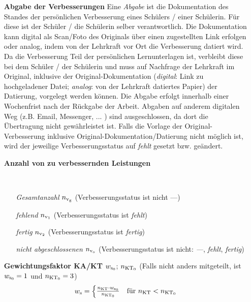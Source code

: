 \begin{enumerate}[label=\textbf{\textbullet}, align=left, leftmargin=*]
	\item[\textbf{Abgabe der Verbesserungen}] { \scriptsize Eine \glqq \textit{Abgabe}\grqq{} ist die Dokumentation des Standes der persönlichen Verbesserung eines Schülers / einer Schülerin. Für diese ist der Schüler / die Schülerin selber verantwortlich. Die Dokumentation kann digital als Scan/Foto des Originals über einen zugestellten Link erfolgen oder analog, indem von der Lehrkraft vor Ort die Verbesserung datiert wird. Da die Verbesserung Teil der persönlichen Lernunterlagen ist, verbleibt diese bei dem Schüler / der Schülerin und muss auf Nachfrage der Lehrkraft im Original, inklusive der Original-Dokumentation (\textit{digital}: Link zu hochgeladener Datei; \textit{analog}: von der Lehrkraft datiertes Papier) der Datierung, vorgelegt werden können. Die Abgabe erfolgt innerhalb einer Wochenfrist nach der Rückgabe der Arbeit. Abgaben auf anderem digitalen Weg (z.B. Email, Messenger, ... ) sind ausgeschlossen, da dort die Übertragung nicht gewährleistet ist. Falls die Vorlage der Original-Verbesserung inklusive Original-Dokumentation/Datierung nicht möglich ist, wird der jeweilige Verbesserungsstatus auf \glqq \textit{fehlt}\grqq{} gesetzt bzw. geändert.} 
	\item[\textbf{Anzahl von zu verbessernden Leistungen}] { \scriptsize \mbox{} \
	\setlength{\columnsep}{-20pt}
	\begin{multicols}{2}
	\begin{enumerate}[label=\textbf{\textbullet}, align=left, leftmargin=*]
		\item[\textit{Gesamtanzahl}] $n_{\mathrm{v}_\mathrm{g}}$ (Verbesserungsstatus ist nicht \glqq ---\grqq{})
		\item[\textit{fehlend}] $n_{\mathrm{v}_1}$ (Verbesserungsstatus ist \glqq \textit{fehlt}\grqq{})
		\item[\textit{fertig}] $n_{\mathrm{v}_2}$ (Verbesserungsstatus ist \glqq \textit{fertig}\grqq{})
		\item[\textit{nicht abgeschlossenen}] $n_{\mathrm{v}_\mathrm{o}}$ (Verbesserungsstatus ist nicht: \glqq\textit{---}\grqq{}, \glqq\textit{fehlt}\grqq{}, \glqq\textit{fertig}\grqq{})
	\end{enumerate}
	\end{multicols}
	}
	\vspace*{-12pt}
	\item[\textbf{Gewichtungsfaktor KA/KT}] $w_{\mathrm{s}_0}$; $n_{\mathrm{KT}_0}$  (Falls nicht anders mitgeteilt, ist $w_{\mathrm{s}_0}=1$ und $n_{\mathrm{KT}_0}=3$)
	\[
	w_{\mathrm{s}} =
	\begin{cases}
		\frac{n_{\mathrm{KT}} \cdot w_{\mathrm{s}_0}}{n_{\mathrm{KT}_0}} & \text{für }    n_{\mathrm{KT}} < n_{\mathrm{KT}_0} \\

\end{cases}\]
\end{enumerate}
